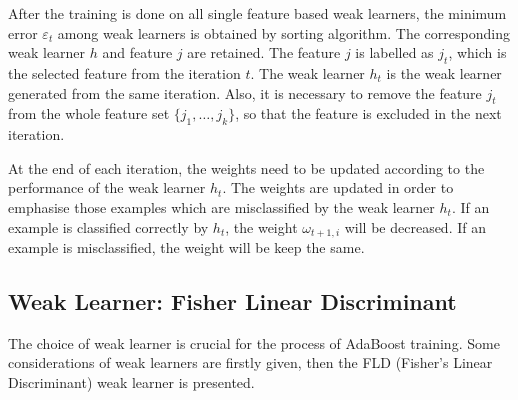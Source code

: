 After the training is done on all single feature based weak learners, the minimum error $\varepsilon_{t}$ among weak learners is obtained by sorting algorithm. The corresponding weak learner $h$ and feature $j$ are retained. The feature $j$ is labelled as $j_{t}$, which is the selected feature from the iteration $t$. The weak learner $h_{t}$ is the weak learner generated from the same iteration. Also, it is necessary to remove the feature $j_{t}$ from the whole feature set $\{j_{1},\ldots,j_{k}\}$, so that the feature is excluded in the next iteration.

At the end of each iteration, the weights need to be updated according to the performance of the weak learner $h_{t}$.  The weights are updated in order to emphasise those examples which are misclassified by the weak learner $h_{t}$.  If an example is classified correctly by $h_{t}$, the weight $\omega_{t+1,i}$ will be decreased. If an example is misclassified, the weight will be keep the same.


\subsection{Weak Learner: Fisher Linear Discriminant}
\label{sec:faceveri:fld}
The choice of weak learner is crucial for the process of AdaBoost training. Some considerations of weak learners are firstly given, then the FLD (Fisher's Linear Discriminant) weak learner is presented.

